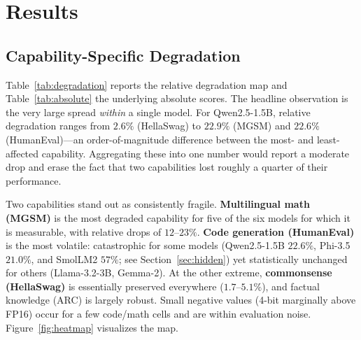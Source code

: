 \documentclass[11pt]{article}
\begin{document}
\section{Results}

\subsection{Capability-Specific Degradation}
\label{sec:degradation}

Table~\ref{tab:degradation} reports the relative degradation map and
Table~\ref{tab:absolute} the underlying absolute scores. The headline observation
is the very large spread \emph{within} a single model. For Qwen2.5-1.5B, relative
degradation ranges from $2.6\%$ (HellaSwag) to $22.9\%$ (MGSM) and $22.6\%$
(HumanEval)---an order-of-magnitude difference between the most- and
least-affected capability. Aggregating these into one number would report a
moderate drop and erase the fact that two capabilities lost roughly a quarter of
their performance.

Two capabilities stand out as consistently fragile. \textbf{Multilingual math
(MGSM)} is the most degraded capability for five of the six models for which it
is measurable, with relative drops of $12$--$23\%$. \textbf{Code generation
(HumanEval)} is the most volatile: catastrophic for some models (Qwen2.5-1.5B
$22.6\%$, Phi-3.5 $21.0\%$, and SmolLM2 $57\%$; see Section~\ref{sec:hidden}) yet
statistically unchanged for others (Llama-3.2-3B, Gemma-2). At the other extreme,
\textbf{commonsense (HellaSwag)} is essentially preserved everywhere
($1.7$--$5.1\%$), and factual knowledge (ARC) is largely robust. Small negative
values (4-bit marginally above FP16) occur for a few code/math cells and are
within evaluation noise. Figure~\ref{fig:heatmap} visualizes the map.
\end{document}
